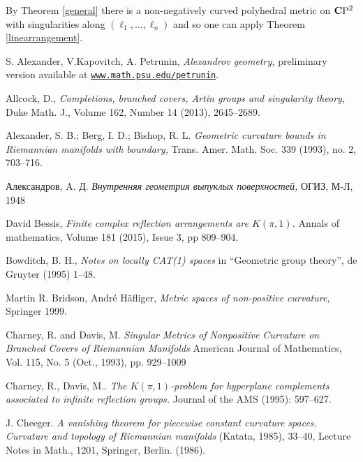 \documentclass{compositio}
\begin{document}
By Theorem \ref{general} there is a non-negatively curved polyhedral metric on
$\mathbf{C}\mathrm{P}^2$ with singularities along $(\ell_1,\dots,\ell_n)$ and so one can apply Theorem \ref{linearrangement}.
\qeds


\begin{thebibliography}{52}

 S. Alexander, V.Kapovitch, A. Petrunin, 
\textit{Alexandrov geometry,}
preliminary version available at \href{http://www.math.psu.edu/petrunin/}{\tt www.math.psu.edu/petrunin}.

 Allcock, D.,
\textit{Completions, branched covers, Artin groups and singularity theory,}
Duke Math. J., Volume 162, Number 14 (2013), 2645--2689. 

Alexander, S. B.; Berg, I. D.; Bishop, R. L. 
\textit{Geometric curvature bounds in Riemannian manifolds with boundary,} 
Trans. Amer. Math. Soc. 339 (1993), no. 2, 703--716.


\begin{otherlanguage}{russian}
Александров, A. Д.
\textit{Внутренняя геометрия выпуклых поверхностей,} ОГИЗ, М-Л, 1948
    \end{otherlanguage}

 David Bessis, 
\textit{Finite complex reflection arrangements are $K(\pi,1)$.}
Annals of mathematics,  Volume 181 (2015), Issue 3, pp 809--904.

 Bowditch, B. H.,
\textit{Notes on locally CAT(1) spaces}
in ``Geometric group theory'',  de Gruyter (1995) 1--48.

 Martin R. Bridson, Andr\'e H\"afliger, 
\textit{Metric spaces of non-positive curvature,} Springer 1999.

Charney, R. and  Davis, M.
\textit{Singular Metrics of Nonpositive Curvature on Branched Covers of Riemannian Manifolds}
American Journal of Mathematics, Vol. 115, No. 5 (Oct., 1993), pp. 929--1009

Charney, R., Davis, M.. 
\textit{The $K(\pi,1)$-problem for hyperplane complements associated to infinite reflection groups.} 
Journal of the AMS (1995): 597--627.

J. Cheeger. 
\textit{A vanishing theorem for piecewise constant curvature spaces. Curvature and topology of Riemannian manifolds}
(Katata, 1985), 33--40, 
Lecture Notes in Math.,
1201, Springer, Berlin. (1986).


\end{thebibliography}
\end{document}
